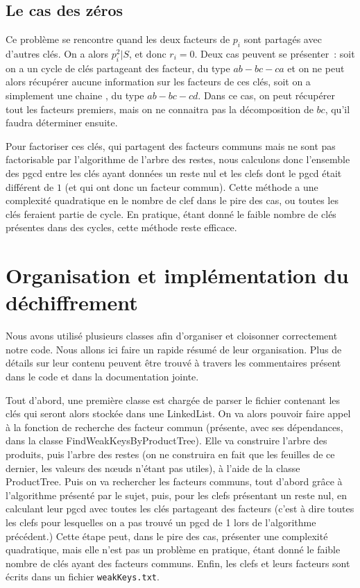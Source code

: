 \documentclass[a4paper,10pt]{article}
\begin{document}
   \subsection{Le \og{}cas des zéros\fg}
  
   Ce problème se rencontre quand les deux facteurs de $p_i$ sont partagés avec d'autres clés. On a alors $p_i^2 | S$, et donc $r_i = 0$. Deux cas peuvent se présenter~: soit on a un \og{} cycle \fg{} de clés partageant des facteur, du type $ab - bc - ca$ et on ne peut alors récupérer aucune information sur les facteurs de ces clés, soit on a simplement une \og{} chaine \fg, du type $ab - bc - cd$. Dans ce cas, on peut récupérer tout les facteurs premiers, mais on ne connaitra pas la décomposition de $bc$, qu'il faudra déterminer ensuite.
  
  Pour factoriser ces clés, qui partagent des facteurs communs mais ne sont pas factorisable par l'algorithme de l'arbre des restes, nous calculons donc l'ensemble des pgcd entre les clés ayant données un reste nul et les clefs dont le pgcd était différent de $1$ (et qui ont donc un facteur commun). Cette méthode a une complexité quadratique en le nombre de clef dans le pire des cas, ou toutes les clés feraient partie de cycle. En pratique, étant donné le faible nombre de clés présentes dans des cycles, cette méthode reste efficace.
  
  \section{Organisation et implémentation du déchiffrement}
  Nous avons utilisé plusieurs classes afin d'organiser et cloisonner correctement notre code. Nous allons ici faire un rapide résumé de leur organisation. Plus de détails sur leur contenu peuvent être trouvé à travers les commentaires présent dans le code et dans la documentation jointe.
  
  Tout d'abord, une première classe est chargée de parser le fichier contenant les clés qui seront alors stockée dans une LinkedList.
  On va alors pouvoir faire appel à la fonction de recherche des facteur commun (présente, avec ses dépendances, dans la classe FindWeakKeysByProductTree). Elle va construire l'arbre des produits, puis l'arbre des restes (on ne construira en fait que les feuilles de ce dernier, les valeurs des nœuds n'étant pas utiles), à l'aide de la classe ProductTree. Puis on va rechercher les facteurs communs, tout d'abord grâce à l'algorithme présenté par le sujet, puis, pour les clefs présentant un reste nul, en calculant leur pgcd avec toutes les clés partageant des facteurs (c'est à dire toutes les clefs pour lesquelles on a pas trouvé un pgcd de 1 lors de l'algorithme précédent.)
  Cette étape peut, dans le pire des cas, présenter une complexité quadratique, mais elle n'est pas un problème en pratique, étant donné le faible nombre de clés ayant des facteurs communs.
  Enfin, les clefs et leurs facteurs sont écrits dans un fichier \texttt{weakKeys.txt}.
  
\end{document}

